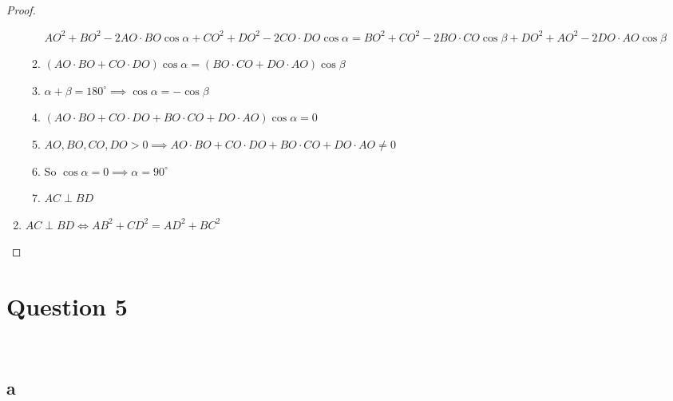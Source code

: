 \documentclass{article}
\begin{document}
\begin{proof}
\begin{enumerate}
\begin{enumerate}
        $AO^2+BO^2-2AO\cdot BO\cos \alpha+CO^2+DO^2-2CO\cdot DO\cos \alpha= BO^2+CO^2-2BO\cdot CO\cos \beta+DO^2+AO^2-2DO\cdot AO\cos \beta$
        \item $(AO\cdot BO+CO\cdot DO)\cos \alpha=(BO\cdot CO+DO\cdot AO)\cos \beta$
        \item $\alpha+\beta=180^\circ\implies \cos\alpha=-\cos\beta$
        \item $(AO\cdot BO+CO\cdot DO+BO\cdot CO+DO\cdot AO)\cos\alpha=0$
        \item $AO,BO,CO,DO>0\implies AO\cdot BO+CO\cdot DO+BO\cdot CO+DO\cdot AO\ne0 $
        \item So $\cos\alpha=0\implies \alpha =90^\circ$
        \item $AC\perp BD$
    \end{enumerate}
    \item $AC\perp BD\iff AB^2+CD^2=AD^2+BC^2$
\end{enumerate}
\end{proof}

\newpage

\section*{Question 5}

~

\subsection*{a}

~
\end{document}
